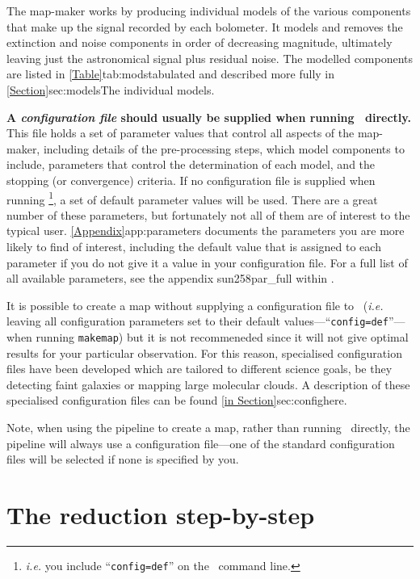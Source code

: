 The map-maker works by producing individual models of the various
components that make up the signal recorded by each bolometer.  It
models and removes the extinction and noise components in order of
decreasing magnitude, ultimately leaving just the astronomical signal
plus residual noise.  The modelled components are listed in
\cref{Table}{tab:mods}{tabulated} and described more fully in
\cref{Section}{sec:models}{The individual models}.

\textbf{A \emph{configuration file} should usually be supplied when
running \makemap\ directly.} This file holds a set of parameter values
that control all aspects of the map-maker, including details of the
pre-processing steps, which model components to include, parameters that
control the determination of each model, and the stopping (or
convergence) criteria. If no configuration file is supplied when running
\makemap\footnote{\emph{i.e.} you include ``\texttt{config=def}'' on the
\makemap\ command line.}, a set of default parameter values will be used.
There are a great number of these parameters, but fortunately not all of
them are of interest to the typical user. \cref{Appendix}{app:parameters}{}
documents the parameters you are more likely to find of interest,
including the default value that is assigned to each parameter if you do
not give it a value in your configuration file.  For a full list of all
available parameters, see the appendix 
{sun258}{par_full} within .

It is possible to create a map without supplying a configuration file to
\makemap\ (\emph{i.e.} leaving all configuration parameters set to their default
values---``\texttt{config=def}''---when running \texttt{makemap}) but it is not
recommeneded since it will not give optimal results
for your particular observation. For this reason, specialised
configuration files have been developed which are tailored to different
science goals, be they detecting faint galaxies or mapping large
molecular clouds. A description of these specialised configuration files
can be found \cref{in Section}{sec:config}{here}.

Note, when using the pipeline to create a map, rather than running
\makemap\ directly, the pipeline will always use a configuration
file---one of the standard configuration files will be selected if none is
specified by you.

\section{The reduction step-by-step}
\label{sec:algorithm}


